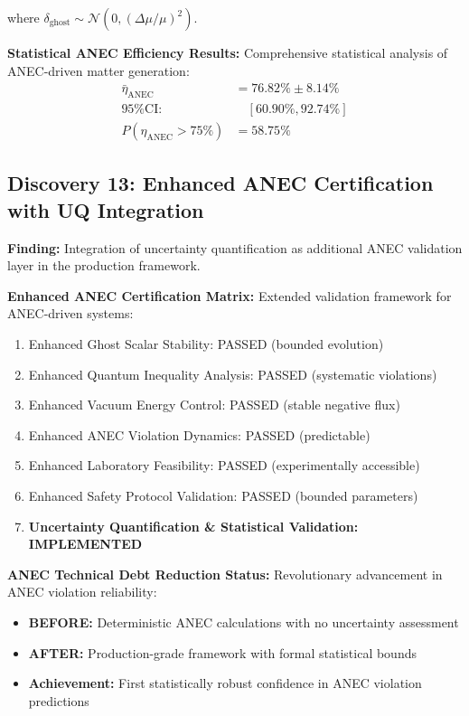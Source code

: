 \documentclass[11pt]{article}
\begin{document}
where $\delta_{\text{ghost}} \sim \mathcal{N}(0, (\Delta\mu/\mu)^2)$.

\textbf{Statistical ANEC Efficiency Results:}
Comprehensive statistical analysis of ANEC-driven matter generation:
\begin{align}
\bar{\eta}_{\text{ANEC}} &= 76.82\% \pm 8.14\% \\
\text{95\% CI:} &\quad [60.90\%, 92.74\%] \\
P(\eta_{\text{ANEC}} > 75\%) &= 58.75\%
\end{align}

\subsection{Discovery 13: Enhanced ANEC Certification with UQ Integration}

\textbf{Finding:} Integration of uncertainty quantification as additional ANEC validation layer in the production framework.

\textbf{Enhanced ANEC Certification Matrix:}
Extended validation framework for ANEC-driven systems:
\begin{enumerate}
\item Enhanced Ghost Scalar Stability: PASSED (bounded evolution)
\item Enhanced Quantum Inequality Analysis: PASSED (systematic violations)
\item Enhanced Vacuum Energy Control: PASSED (stable negative flux)
\item Enhanced ANEC Violation Dynamics: PASSED (predictable)
\item Enhanced Laboratory Feasibility: PASSED (experimentally accessible)
\item Enhanced Safety Protocol Validation: PASSED (bounded parameters)
\item \textbf{Uncertainty Quantification \& Statistical Validation: IMPLEMENTED}
\end{enumerate}

\textbf{ANEC Technical Debt Reduction Status:}
Revolutionary advancement in ANEC violation reliability:
\begin{itemize}
\item \textbf{BEFORE:} Deterministic ANEC calculations with no uncertainty assessment
\item \textbf{AFTER:} Production-grade framework with formal statistical bounds
\item \textbf{Achievement:} First statistically robust confidence in ANEC violation predictions
\end{itemize}
\end{document}
